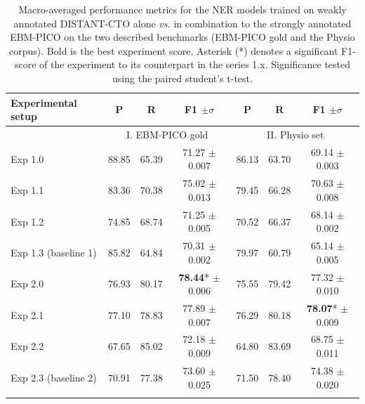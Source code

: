 \documentclass[11pt]{article}
\begin{document}
\begin{table}[hbt!]
    \centering
    \begin{tabular}{lccc|ccc}
        \Xhline{1pt}
        Experimental setup & P & R & F1 $\pm\sigma$ & P & R & F1 $\pm\sigma$\\
        \hline 
        & \multicolumn{3}{c}{I. EBM-PICO gold} & \multicolumn{3}{c}{II. Physio set}  \\
        Exp 1.0 & 88.85 & 65.39 & 71.27 $\pm$0.007 & 86.13 & 63.70 & 69.14 $\pm$0.003\\
        Exp 1.1 & 83.36 & 70.38 & 75.02 $\pm$0.013 & 79.45 & 66.28 & 70.63 $\pm$0.008\\
        Exp 1.2 & 74.85 & 68.74 & 71.25 $\pm$0.005 & 70.52 & 66.37 & 68.14 $\pm$0.002 \\
        Exp 1.3 (baseline 1) & 85.82 & 64.84 & 70.31 $\pm$0.002 & 79.97 & 60.79 & 65.14 $\pm$0.005 \\
        Exp 2.0 & 76.93  & 80.17  & \textbf{78.44}* $\pm$0.006 & 75.55  & 79.42 & 77.32 $\pm$0.010\\
        Exp 2.1 & 77.10 & 78.83 & 77.89 $\pm$0.007 & 76.29 & 80.18 & \textbf{78.07}* $\pm$0.009\\
        Exp 2.2 & 67.65 & 85.02 & 72.18 $\pm$0.009  & 64.80 & 83.69 & 68.75 $\pm$0.011 \\
        Exp 2.3 (baseline 2) & 70.91 & 77.38 & 73.60 $\pm$0.025 & 71.50 & 78.40 & 74.38 $\pm$0.020 \\
        \Xhline{1pt}
    \end{tabular}
    \caption{Macro-averaged performance metrics for the NER models trained on weakly annotated DISTANT-CTO alone \textit{vs.} in combination to the strongly annotated EBM-PICO on the two described benchmarks (EBM-PICO gold and the Physio corpus). Bold is the best experiment score. Asterisk (*) denotes a significant F1-score of the experiment to its counterpart in the series 1.x. Significance tested using the paired student's t-test.}
    \label{tab:results_modeltraining}
\end{table}
%
%
%
%
%
%
\end{document}
